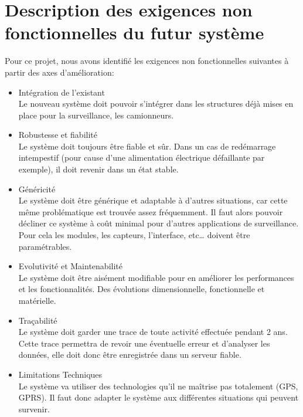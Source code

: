 \section{Description des exigences non fonctionnelles du futur système}

Pour ce projet, nous avons identifié les exigences non fonctionnelles suivantes à partir des axes d’amélioration:

\begin{itemize}

\item Intégration de l’existant \\
Le nouveau système doit pouvoir s’intégrer dans les structures déjà mises en place pour la surveillance, les camionneurs.

\item Robustesse et fiabilité \\
Le système doit toujours être fiable et sûr. Dans un cas de redémarrage intempestif (pour cause d’une alimentation électrique défaillante par exemple), il doit revenir dans un état stable.

\item Généricité \\
Le système doit être générique et adaptable à d’autres situations, car cette 
même problématique est trouvée assez fréquemment. Il faut alors pouvoir décliner 
ce système à coût minimal pour d’autres applications de surveillance. Pour cela 
les modules, les capteurs, l’interface, etc… doivent être paramétrables.

\item Evolutivité et Maintenabilité \\
Le système doit être aisément modifiable pour en améliorer les performances et 
les fonctionnalités. Des évolutions dimensionnelle, fonctionnelle et matérielle.

\item Traçabilité \\
Le système doit garder une trace de toute activité effectuée pendant 2 ans. 
Cette trace permettra de revoir une éventuelle erreur et d’analyser les données, 
elle doit donc être enregistrée dans un serveur fiable.

\item Limitations Techniques \\
Le système va utiliser des technologies qu'il ne maîtrise pas totalement (GPS, GPRS). 
Il faut donc adapter le système aux différentes situations qui peuvent survenir.


\end{itemize}
